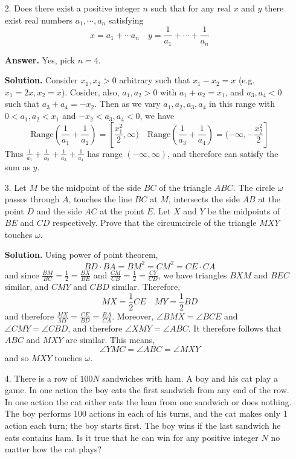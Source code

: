 \documentclass[11pt,a4paper]{article}
\begin{document}
\begin{enumerate}
	\item[2.]
	Does there exist a positive integer $n$ such that for any real $x$ and $y$ there exist real numbers $a_1, \cdots , a_n$
	satisfying
	\[
	x=a_1+\cdots a_n
	\quad 
	y=\frac{1}{a_1}+\cdots+\frac{1}{a_n}
	\]
	
	\textbf{Answer.} Yes, pick $n=4$. 
	
	\textbf{Solution.} 
	Consider $x_1, x_2>0$ arbitrary such that $x_1-x_2=x$ (e.g. $x_1=2x, x_2=x$). 
	Cosider, also, $a_1, a_2>0$ with $a_1+a_2=x_1$, and $a_3, a_4<0$ such that $a_3+a_4=-x_2$. 
	Then as we vary $a_1, a_2, a_3, a_4$ in this range with $0<a_1, a_2<x_1$ and $-x_2<a_3, a_4<0$, we have 
	\[
	\text{Range}(\frac{1}{a_1}+\frac{1}{a_2}) = [\frac{x_1^2}{2}, \infty)
	\quad 
	\text{Range}(\frac{1}{a_3}+\frac{1}{a_4}) = (-\infty, -\frac{x_2^2}{2}]
	\]
	Thus $\frac{1}{a_1}+\frac{1}{a_2}+\frac{1}{a_3}+\frac{1}{a_4}$ has range $(-\infty, \infty)$, 
	and therefore can satisfy the sum as $y$. 
	
	\item[3.]
	Let $M$ be the midpoint of the side $BC$ of the triangle $ABC$. 
	The circle $\omega$ passes through $A$, touches the line $BC$ at $M$, 
	intersects the side $AB$ at the point $D$ and the side $AC$ at the point $E$. 
	Let $X$ and $Y$ be the midpoints of $BE$ and $CD$ respectively. 
	Prove that the circumcircle of the triangle $MXY$ touches $\omega$.
	
	\textbf{Solution.} 
	Using power of point theorem, 
	\[
	BD\cdot BA = BM^2 = CM^2 = CE\cdot CA
	\]
	and since $\frac{BM}{BC}=\frac 12 = \frac{BX}{BE}$ and $\frac{CM}{CB}=\frac 12 =\frac{CY}{CD}$, 
	we have triangles $BXM$ and $BEC$ similar, and $CMY$ and $CBD$ similar. 
	Therefore, 
	\[
	MX =  \frac 12 CE\quad MY = \frac 12 BD
	\]
	and therefore $\frac{MX}{MY}=\frac{CE}{BD}=\frac{BA}{CA}$. 
	Moreover, $\angle BMX = \angle BCE$ and $\angle CMY = \angle CBD$, 
	and therefore $\angle XMY = \angle ABC$. 
	It therefore follows that $ABC$ and $MXY$ are similar. 
	This means, 
	\[
	\angle YMC = \angle ABC = \angle MXY
	\]
	and so $MXY$ touches $\omega$. 
	
	\item[4.]
	There is a row of $100N$ sandwiches with ham. A boy and his cat play a game. In one action the
	boy eats the first sandwich from any end of the row. In one action the cat either eats the ham from
	one sandwich or does nothing. The boy performs 100 actions in each of his turns, and the cat makes
	only 1 action each turn; the boy starts first. The boy wins if the last sandwich he eats contains ham.
	Is it true that he can win for any positive integer $N$ no matter how the cat plays?	
	

\end{enumerate}
\end{document}
